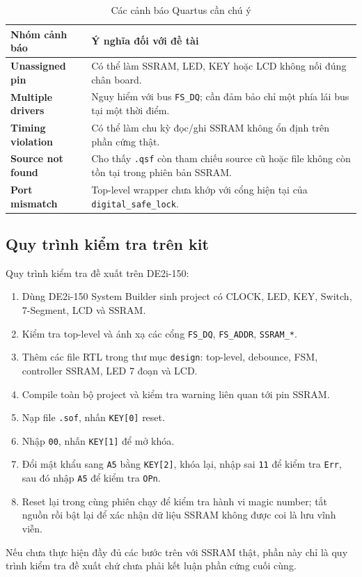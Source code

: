 \documentclass[13pt,a4paper]{article}
\begin{document}
\begin{table}[H]
\centering
\caption{Các cảnh báo Quartus cần chú ý}
\label{tab:quartus_warning}
\begin{tabularx}{\textwidth}{|>{\bfseries}p{4.2cm}|X|}
\hline
\textbf{Nhóm cảnh báo} & \textbf{Ý nghĩa đối với đề tài}\\
\hline
Unassigned pin & Có thể làm SSRAM, LED, KEY hoặc LCD không nối đúng chân board.\\
\hline
Multiple drivers & Nguy hiểm với bus \texttt{FS\_DQ}; cần đảm bảo chỉ một phía lái bus tại một thời điểm.\\
\hline
Timing violation & Có thể làm chu kỳ đọc/ghi SSRAM không ổn định trên phần cứng thật.\\
\hline
Source not found & Cho thấy \texttt{.qsf} còn tham chiếu source cũ hoặc file không còn tồn tại trong phiên bản SSRAM.\\
\hline
Port mismatch & Top-level wrapper chưa khớp với cổng hiện tại của \texttt{digital\_safe\_lock}.\\
\hline
\end{tabularx}
\end{table}

\subsection{Quy trình kiểm tra trên kit}
Quy trình kiểm tra đề xuất trên DE2i-150:
\begin{enumerate}
  \item Dùng DE2i-150 System Builder sinh project có CLOCK, LED, KEY, Switch, 7-Segment, LCD và SSRAM.
  \item Kiểm tra top-level và ánh xạ các cổng \texttt{FS\_DQ}, \texttt{FS\_ADDR}, \texttt{SSRAM\_*}.
  \item Thêm các file RTL trong thư mục \texttt{design}: top-level, debounce, FSM, controller SSRAM, LED 7 đoạn và LCD.
  \item Compile toàn bộ project và kiểm tra warning liên quan tới pin SSRAM.
  \item Nạp file \texttt{.sof}, nhấn \texttt{KEY[0]} reset.
  \item Nhập \texttt{00}, nhấn \texttt{KEY[1]} để mở khóa.
  \item Đổi mật khẩu sang \texttt{A5} bằng \texttt{KEY[2]}, khóa lại, nhập sai \texttt{11} để kiểm tra \texttt{Err}, sau đó nhập \texttt{A5} để kiểm tra \texttt{OPn}.
  \item Reset lại trong cùng phiên chạy để kiểm tra hành vi magic number; tắt nguồn rồi bật lại để xác nhận dữ liệu SSRAM không được coi là lưu vĩnh viễn.
\end{enumerate}
Nếu chưa thực hiện đầy đủ các bước trên với SSRAM thật, phần này chỉ là quy trình kiểm tra đề xuất chứ chưa phải kết luận phần cứng cuối cùng.
\end{document}
